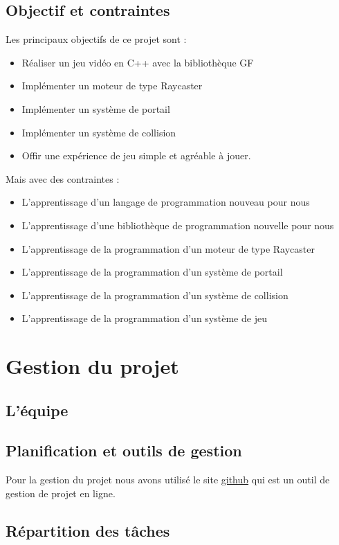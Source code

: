\documentclass[12pt]{report}
\begin{document}
\subsection{Objectif et contraintes}

Les principaux objectifs de ce projet sont :
\begin{itemize}
	\item Réaliser un jeu vidéo en C++ avec la bibliothèque GF
	\item Implémenter un moteur de type Raycaster
	\item Implémenter un système de portail
	\item Implémenter un système de collision
	\item Offir une expérience de jeu simple et agréable à jouer.
\end{itemize}

Mais avec des contraintes :
\begin{itemize}
	\item L'apprentissage d'un langage de programmation nouveau pour nous
	\item L'apprentissage d'une bibliothèque de programmation nouvelle pour nous
	\item L'apprentissage de la programmation d'un moteur de type Raycaster
	\item L'apprentissage de la programmation d'un système de portail
	\item L'apprentissage de la programmation d'un système de collision
	\item L'apprentissage de la programmation d'un système de jeu
\end{itemize}

\section{Gestion du projet}
\subsection{L'équipe}
\subsection{Planification et outils de gestion}

Pour la gestion du projet nous avons utilisé le site \href{https://github.com/}{github}\cite{Github} qui est un outil de gestion de projet en ligne.

\subsection{Répartition des tâches}
\end{document}
